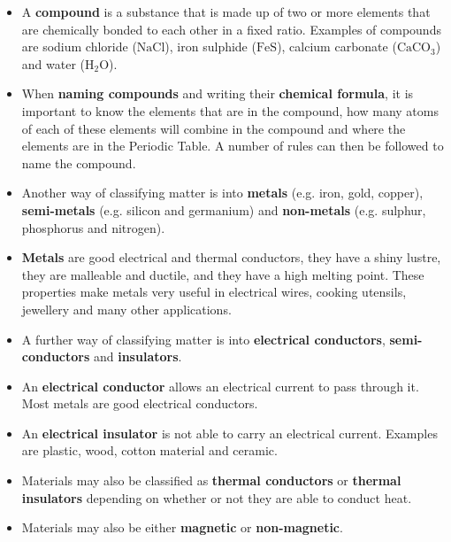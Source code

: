 \begin{itemize}[noitemsep]
\label{m38706*uid124}\item A \textbf{compound} is a substance that is made up of two or more elements that are chemically bonded to each other in a fixed ratio. Examples of compounds are sodium chloride ($\mathrm{NaCl}$), iron sulphide ($\mathrm{FeS}$), calcium carbonate (${\mathrm{CaCO}}_{3}$) and water (${\mathrm{H}}_{2}\mathrm{O}$).
\label{m38706*uid125}\item When \textbf{naming compounds} and writing their \textbf{chemical formula}, it is important to know the elements that are in the compound, how many atoms of each of these elements will combine in the compound and where the elements are in the Periodic Table. A number of rules can then be followed to name the compound.
\label{m38706*uid126}\item Another way of classifying matter is into \textbf{metals} (e.g. iron, gold, copper), \textbf{semi-metals} (e.g. silicon and germanium) and \textbf{non-metals} (e.g. sulphur, phosphorus and nitrogen).
\label{m38706*uid127}\item \textbf{Metals} are good electrical and thermal conductors, they have a shiny lustre, they are malleable and ductile, and they have a high melting point. These properties make metals very useful in electrical wires, cooking utensils, jewellery and many other applications.
\label{m38706*uid128}\item A further way of classifying matter is into \textbf{electrical conductors}, \textbf{semi-conductors} and \textbf{insulators}.
\label{m38706*uid129}\item An \textbf{electrical conductor} allows an electrical current to pass through it. Most metals are good electrical conductors.
\label{m38706*uid130}\item An \textbf{electrical insulator} is not able to carry an electrical current. Examples are plastic, wood, cotton material and ceramic.
\label{m38706*uid131}\item Materials may also be classified as \textbf{thermal conductors} or \textbf{thermal insulators} depending on whether or not they are able to conduct heat.
\label{m38706*uid132}\item Materials may also be either \textbf{magnetic} or \textbf{non-magnetic}.
\end{itemize}
\label{m38706*secfhsst!!!underscore!!!id672}
